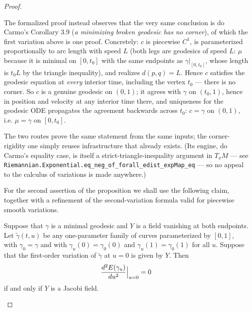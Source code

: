 \begin{proof}
\begin{remark}
The formalized proof instead observes that the very same conclusion is do Carmo's
Corollary 3.9 (\emph{a minimizing broken geodesic has no corner}), of which the first
variation above is one proof.  Concretely: $c$ is piecewise $C^1$, is parameterized
proportionally to arc length with speed $L$ (both legs are geodesics of speed $L$: $\mu$
because it is minimal on $[0,t_0]$ with the same endpoints as $\gamma|_{[0,t_0]}$, whose
length is $t_0L$ by the triangle inequality), and realizes $d(p,q)=L$.  Hence $c$
satisfies the geodesic equation at \emph{every} interior time, including the vertex
$t_0$ --- there is no corner.  So $c$ is a genuine geodesic on $(0,1)$; it agrees with
$\gamma$ on $(t_0,1)$, hence in position and velocity at any interior time there, and
uniqueness for the geodesic ODE propagates the agreement backwards across $t_0$: $c=\gamma$
on $(0,1)$, i.e. $\mu=\gamma$ on $[0,t_0]$.

The two routes prove the same statement from the same inputs; the corner-rigidity one
simply reuses infrastructure that already exists.  (Its engine, do Carmo's equality case,
is itself a strict-triangle-inequality argument in $T_xM$ --- see
\texttt{Riemannian.Exponential.eq\_neg\_of\_forall\_edist\_expMap\_eq} --- so no appeal to
the calculus of variations is made anywhere.)
\end{remark}

For the second assertion of the proposition we shall use the
following claim, together with a refinement of the second-variation
formula valid for piecewise smooth variations.

\begin{lemma}
\label{claim:second-variation-minimal-geodesic}
Suppose that $\gamma$ is a minimal geodesic and $Y$ is a field
vanishing at both endpoints. Let $\tilde\gamma(t,u)$ be any
one-parameter family of curves parameterized by $[0,1]$, with
$\gamma_0=\gamma$ and with $\gamma_u(0)=\gamma_0(0)$ and
$\gamma_u(1)=\gamma_0(1)$ for all $u$.
Suppose that the first-order variation of $\tilde \gamma$ at $u=0$
is given by $Y$. Then
$$\frac{d^2E(\gamma_u)}{du^2}\Bigl|_{u=0}\Bigr.=0$$
if and only if $Y$ is a Jacobi field.
\end{lemma}


\end{proof}
